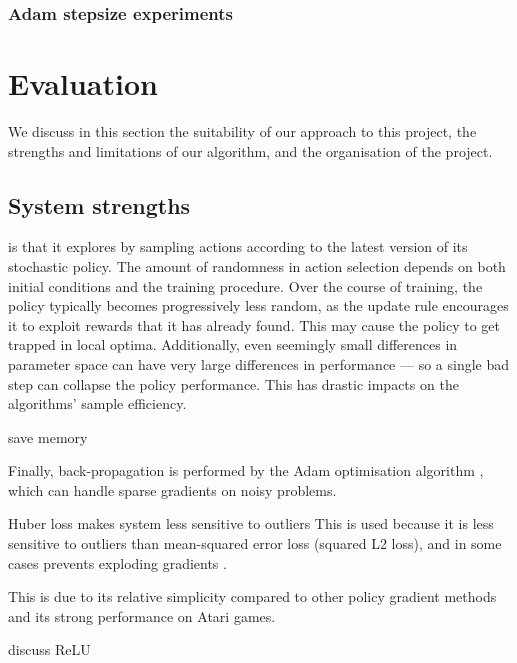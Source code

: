 \documentclass[12pt,a4paper]{article}
\begin{document}
\subsubsection{Adam stepsize experiments}

\newpage
\section{Evaluation}
We discuss in this section the suitability of our approach to this project, the strengths and limitations of our algorithm, and the organisation of the project.

\subsection{System strengths} 
is that it explores by sampling actions according to the latest version of its stochastic policy. The amount of randomness in action selection depends on both initial conditions and the training procedure. Over the course of training, the policy typically becomes progressively less random, as the update rule encourages it to exploit rewards that it has already found. This may cause the policy to get trapped in local optima. Additionally, even seemingly small differences in parameter space can have very large differences in performance --- so a single bad step can collapse the policy performance. This has drastic impacts on the algorithms' sample efficiency.

save memory

Finally, back-propagation is performed by the Adam optimisation algorithm \cite{kingma2017adam}, which can handle sparse gradients on noisy problems.

Huber loss makes system less sensitive to outliers
This is used because it is less sensitive to outliers than mean-squared error loss (squared L2 loss), and in some cases prevents exploding gradients \cite{DBLP:journals/corr/Girshick15}.

This is due to its relative simplicity compared to other policy gradient methods and its strong performance on Atari games.

discuss ReLU


\end{document}
